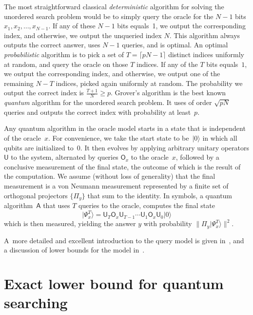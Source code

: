\documentclass{article}
\newcommand{\op}[1]{\mathsf{#1}}
\newcommand{\ket}[1]{\vert #1 \rangle}
\newcommand{\proj}{\mathsf{\Pi}}
\begin{document}
The most straightforward classical \textit{deterministic} algorithm
for solving the unordered search problem would be to simply query the
oracle for the $N-1$ bits $x_1, x_2, \ldots, x_{N-1}$.  If any of
these $N-1$ bits equals~1, we output the corresponding index, and
otherwise, we output the unqueried index $N$.  This algorithm always
outputs the correct answer, uses $N-1$ queries, and is optimal.
%
An optimal \textit{probabilistic} algorithm is to pick a set of $T=
\lceil p N -1\rceil$ distinct indices uniformly at random, and query
the oracle on those $T$ indices.  If any of the $T$ bits equals~$1$,
we output the corresponding index, and otherwise, we output one of the
remaining $N-T$ indices, picked again uniformly at random.  The
probability we output the correct index is $\frac{T+1}{N} \geq p$.
%
Grover's algorithm is the best known \textit{quantum} algorithm for
the unordered search problem.  It uses of order $\sqrt{p N}$ queries
and outputs the correct index with probability at least~$p$.

Any quantum algorithm in the oracle model starts in a state that is
independent of the oracle~$x$.  For convenience, we take the start
state to be~$\ket{0}$ in which all qubits are initialized to~0.  It
then evolves by applying arbitrary unitary operators $\op{U}$ to the
system, alternated by queries $\op{O}_x$ to the oracle~$x$, followed
by a conclusive measurement of the final state, the outcome of which
is the result of the computation.  We assume (without loss of
generality) that the final measurement is a von Neumann measurement
represented by a finite set of orthogonal projectors $\big\{ \proj_y
\big\}$ that sum to the identity.  In symbols, a quantum
algorithm~$\op{A}$ that uses $T$ queries to the oracle, computes the
final state
\begin{equation*}
\ket{\Psi_x^T} = \op{U}_T \op{O}_x \op{U}_{T-1} \cdots
  \op{U}_1 \op{O}_x \op{U}_0 \ket{0}
\end{equation*}
which is then measured, yielding the answer $y$ with probability
$\big\| \proj_y \ket{\Psi_x^T} \big\|^2$.  

A~more detailed and excellent introduction to the query model is given
in~\cite{bw}, and a discussion of lower bounds for the model
in~\cite{hoyerlb}.


\section{Exact lower bound for quantum searching}
\label{sec:thebound}
\end{document}
